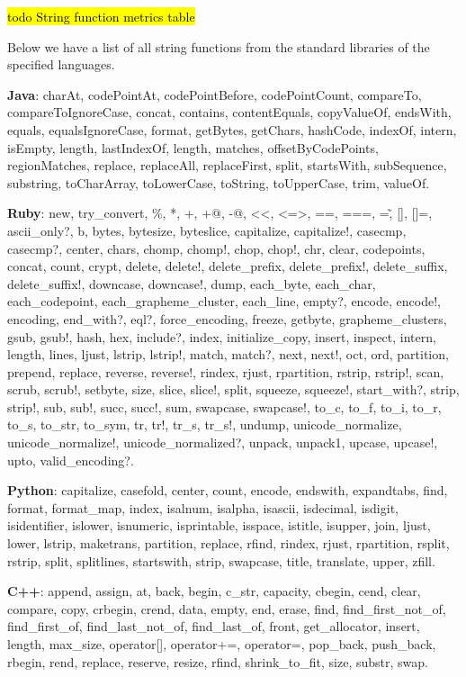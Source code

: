 \documentclass[anonymous,sigplan,review,11pt,nonacm,natbib=false]{acmart}
\begin{document}
    \hl{todo String function metrics table}

    Below we have a list of all string functions from the standard libraries of the specified languages.

    \textbf{Java}: charAt, codePointAt, codePointBefore, codePointCount, compareTo, compareToIgnoreCase, concat, contains, contentEquals, copyValueOf, endsWith, equals, equalsIgnoreCase, format, getBytes, getChars, hashCode, indexOf, intern, isEmpty, length, lastIndexOf, length, matches, offsetByCodePoints, regionMatches, replace, replaceAll, replaceFirst, split, startsWith, subSequence, substring, toCharArray, toLowerCase, toString, toUpperCase, trim, valueOf.

    \textbf{Ruby}: new, try\_convert, \%, *, +, +@, -@, <<, <=>, ==, ===, =\~, [], []=, ascii\_only?, b, bytes, bytesize, byteslice, capitalize, capitalize!, casecmp, casecmp?, center, chars, chomp, chomp!, chop, chop!, chr, clear, codepoints, concat, count, crypt, delete, delete!, delete\_prefix, delete\_prefix!, delete\_suffix, delete\_suffix!, downcase, downcase!, dump, each\_byte, each\_char, each\_codepoint, each\_grapheme\_cluster, each\_line, empty?, encode, encode!, encoding, end\_with?, eql?, force\_encoding, freeze, getbyte, grapheme\_clusters, gsub, gsub!, hash, hex, include?, index, initialize\_copy, insert, inspect, intern, length, lines, ljust, lstrip, lstrip!, match, match?, next, next!, oct, ord, partition, prepend, replace, reverse, reverse!, rindex, rjust, rpartition, rstrip, rstrip!, scan, scrub, scrub!, setbyte, size, slice, slice!, split, squeeze, squeeze!, start\_with?, strip, strip!, sub, sub!, succ, succ!, sum, swapcase, swapcase!, to\_c, to\_f, to\_i, to\_r, to\_s, to\_str, to\_sym, tr, tr!, tr\_s, tr\_s!, undump, unicode\_normalize, unicode\_normalize!, unicode\_normalized?, unpack, unpack1, upcase, upcase!, upto, valid\_encoding?.

    \textbf{Python}: capitalize, casefold, center, count, encode, endswith, expandtabs, find, format, format\_map, index, isalnum, isalpha, isascii, isdecimal, isdigit, isidentifier, islower, isnumeric, isprintable, isspace, istitle, isupper, join, ljust, lower, lstrip, maketrans, partition, replace, rfind, rindex, rjust, rpartition, rsplit, rstrip, split, splitlines, startswith, strip, swapcase, title, translate, upper, zfill.

    \textbf{C++}: append, assign, at, back, begin, c\_str, capacity, cbegin, cend, clear, compare, copy, crbegin, crend, data, empty, end, erase, find, find\_first\_not\_of, find\_first\_of, find\_last\_not\_of, find\_last\_of, front, get\_allocator, insert, length, max\_size, operator[], operator+=, operator=, pop\_back, push\_back, rbegin, rend, replace, reserve, resize, rfind, shrink\_to\_fit, size, substr, swap.
\end{document}
